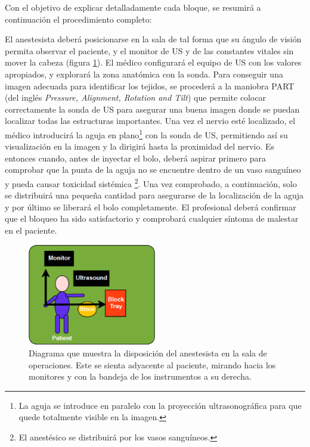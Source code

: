 Con el objetivo de explicar detalladamente cada bloque, se resumirá a continuación el procedimiento completo:

El anestesista deberá posicionarse en la sala de tal forma que su ángulo de visión permita observar el paciente, y el monitor de \ac{US} y de las constantes vitales sin mover la cabeza (figura \ref{fig:roomplace}). El médico configurará el equipo de \ac{US} con los valores apropiados, y explorará la zona anatómica con la sonda. Para conseguir una imagen adecuada para identificar los tejidos, se procederá a la maniobra PART (del inglés \emph{Pressure, Alignment, Rotation and Tilt}) que permite colocar correctamente la sonda de \ac{US} para asegurar una buena imagen donde se puedan localizar todas las estructuras importantes. Una vez el nervio esté localizado, el médico introducirá la aguja en plano\footnote{La aguja se introduce en paralelo con la proyección ultrasonográfica para que quede totalmente visible en la imagen.} con la sonda de \ac{US}, permitiendo así su visualización en la imagen y la dirigirá hasta la proximidad del nervio. Es entonces cuando, antes de inyectar el bolo, deberá aspirar primero para comprobar que la punta de la aguja no se encuentre dentro de un vaso sanguíneo y pueda causar toxicidad sistémica \footnote{El anestésico se distribuirá por los vasos sanguíneos.}. Una vez comprobado, a continuación, solo se distribuirá una pequeña cantidad para asegurarse de la localización de la aguja y por último se liberará el bolo completamente. El profesional deberá confirmar que el bloqueo ha sido satisfactorio y comprobará cualquier síntoma de malestar en el paciente.


\begin{figure}[th]
   \centering
    \includegraphics[width=0.5\textwidth]{IMG/roomplacement.png}
    \caption{Diagrama que muestra la disposición del anestesista en la sala de operaciones. Este se sienta adyacente al paciente, mirando hacia los monitores y con la bandeja de los instrumentos a su derecha.}
   \label{fig:roomplace}
\end{figure}





